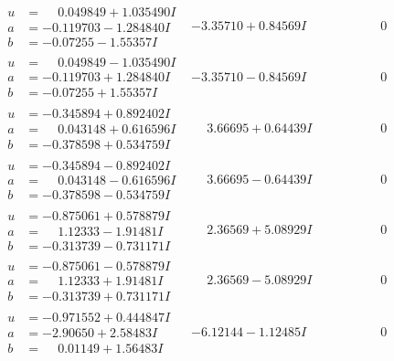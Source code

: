 \documentclass[1p]{elsarticle_modified}
\theoremstyle{definition}
\begin{document}
$$\begin{array}{c|c|c}
\begin{aligned}
u &= \phantom{-}0.049849 + 1.035490 I \\
a &= -0.119703 - 1.284840 I \\
b &= -0.07255 - 1.55357 I\end{aligned}
 & -3.35710 + 0.84569 I & \phantom{-0.000000 } 0 \\ \hline\begin{aligned}
u &= \phantom{-}0.049849 - 1.035490 I \\
a &= -0.119703 + 1.284840 I \\
b &= -0.07255 + 1.55357 I\end{aligned}
 & -3.35710 - 0.84569 I & \phantom{-0.000000 } 0 \\ \hline\begin{aligned}
u &= -0.345894 + 0.892402 I \\
a &= \phantom{-}0.043148 + 0.616596 I \\
b &= -0.378598 + 0.534759 I\end{aligned}
 & \phantom{-}3.66695 + 0.64439 I & \phantom{-0.000000 } 0 \\ \hline\begin{aligned}
u &= -0.345894 - 0.892402 I \\
a &= \phantom{-}0.043148 - 0.616596 I \\
b &= -0.378598 - 0.534759 I\end{aligned}
 & \phantom{-}3.66695 - 0.64439 I & \phantom{-0.000000 } 0 \\ \hline\begin{aligned}
u &= -0.875061 + 0.578879 I \\
a &= \phantom{-}1.12333 - 1.91481 I \\
b &= -0.313739 - 0.731171 I\end{aligned}
 & \phantom{-}2.36569 + 5.08929 I & \phantom{-0.000000 } 0 \\ \hline\begin{aligned}
u &= -0.875061 - 0.578879 I \\
a &= \phantom{-}1.12333 + 1.91481 I \\
b &= -0.313739 + 0.731171 I\end{aligned}
 & \phantom{-}2.36569 - 5.08929 I & \phantom{-0.000000 } 0 \\ \hline\begin{aligned}
u &= -0.971552 + 0.444847 I \\
a &= -2.90650 + 2.58483 I \\
b &= \phantom{-}0.01149 + 1.56483 I\end{aligned}
 & -6.12144 - 1.12485 I & \phantom{-0.000000 } 0 \\ \hline\begin{aligned}

\end{aligned}
\end{array}$$
\end{document}
